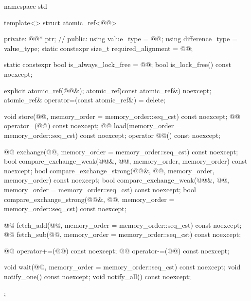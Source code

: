 \begin{codeblock}
namespace std {
  template<> struct atomic_ref<@@> {
  private:
    @@* ptr;  // \expos
  public:
    using value_type = @@;
    using difference_type = value_type;
    static constexpr size_t required_alignment = @@;

    static constexpr bool is_always_lock_free = @@;
    bool is_lock_free() const noexcept;

    explicit atomic_ref(@@&);
    atomic_ref(const atomic_ref&) noexcept;
    atomic_ref& operator=(const atomic_ref&) = delete;

    void store(@@, memory_order = memory_order::seq_cst) const noexcept;
    @@ operator=(@@) const noexcept;
    @@ load(memory_order = memory_order::seq_cst) const noexcept;
    operator @@() const noexcept;

    @@ exchange(@@,
                            memory_order = memory_order::seq_cst) const noexcept;
    bool compare_exchange_weak(@@&, @@,
                               memory_order, memory_order) const noexcept;
    bool compare_exchange_strong(@@&, @@,
                                 memory_order, memory_order) const noexcept;
    bool compare_exchange_weak(@@&, @@,
                               memory_order = memory_order::seq_cst) const noexcept;
    bool compare_exchange_strong(@@&, @@,
                                 memory_order = memory_order::seq_cst) const noexcept;

    @@ fetch_add(@@,
                             memory_order = memory_order::seq_cst) const noexcept;
    @@ fetch_sub(@@,
                             memory_order = memory_order::seq_cst) const noexcept;

    @@ operator+=(@@) const noexcept;
    @@ operator-=(@@) const noexcept;

    void wait(@@, memory_order = memory_order::seq_cst) const noexcept;
    void notify_one() const noexcept;
    void notify_all() const noexcept;
  };
}
\end{codeblock}

